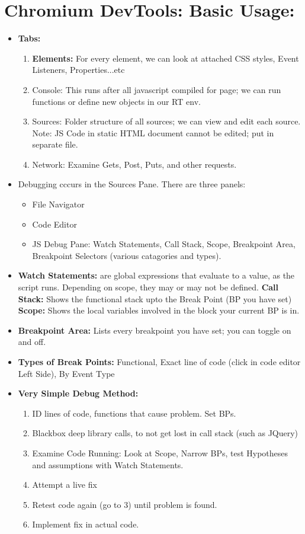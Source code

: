 \documentclass[8pt,a4paper]{extarticle}
\begin{document}
\section*{Chromium DevTools: Basic Usage:}
\begin{itemize}
\item \textbf{Tabs:}
\begin{enumerate}
\item \textbf{Elements:} For every element, we can look at attached CSS styles, Event Listeners, Properties...etc 
\item Console: This runs after all javascript compiled for page; we can run functions or define new objects in our RT env.
\item Sources: Folder structure of all sources; we can view and edit each source. Note: JS Code in static HTML document cannot be edited; put in separate file.
\item Network: Examine Gets, Post, Puts, and other requests.
\end{enumerate}
\item Debugging cccurs in the Sources Pane. There are three panels:
\begin{itemize}
\item File Navigator
\item Code Editor
\item JS Debug Pane: Watch Statements, Call Stack, Scope, Breakpoint Area, Breakpoint Selectors (various catagories and types).
\end{itemize}
\item \textbf{Watch Statements:} are global expressions that evaluate to a value, as the script runs. Depending on scope, they may or may not be defined.
\textbf{Call Stack:} Shows the functional stack upto the Break Point (BP you have set)
\textbf{Scope:} Shows the local variables involved in the block your current BP is in.
\item \textbf{Breakpoint Area:} Lists every breakpoint you have set; you can toggle on and off.
\item \textbf{Types of Break Points:} Functional, Exact line of code (click in code editor Left Side), By Event Type
\item \textbf{Very Simple Debug Method:}
\begin{enumerate}
\item ID lines of code, functions that cause problem. Set BPs.
\item Blackbox deep library calls, to not get lost in call stack (such as JQuery)
\item Examine Code Running: Look at Scope, Narrow BPs, test Hypotheses and assumptions with Watch Statements.
\item Attempt a live fix
\item Retest code again (go to 3) until problem is found.
\item Implement fix in actual code.
\end{enumerate}


\end{itemize}
\end{document}
